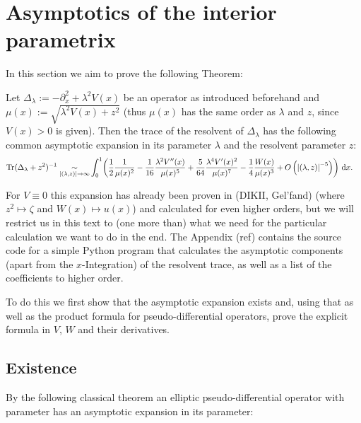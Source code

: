 \section{Asymptotics of the interior parametrix}
In this section we aim to prove the following Theorem:
\begin{MainTheorem}
  Let $\Delta_\lambda := -\partial_x^2 + \lambda^2V(x) $ be an operator as
  introduced beforehand and $\mu(x) := \sqrt{\lambda^2 V(x) + z^2}$ (thus
  $\mu(x)$ has the same order as $\lambda$ and $z$, since $V(x) > 0$ is given).
  Then the trace of the resolvent of $\Delta_\lambda$ has the following common
  asymptotic expansion in its parameter $\lambda$ and the resolvent parameter
  $z$:
  \begin{align*}
  \Tr(\Delta_\lambda + z^2)^{-1} \SimAs{\Abs{(\lambda, z)}\to\infty}&
   \Int{x}{\left(
      \frac12\frac1{\mu(x)^{2}}
     -\frac1{16}\frac{\lambda^2 V''(x)}{\mu(x)^5}
     +\frac{5}{64}\frac{\lambda^4V'(x)^2}{\mu(x)^7}
     -\frac14\frac{W(x)}{\mu(x)^3}
     +O\left(\Abs{(\lambda, z)}^{-5}\right)
   \right)}.
  \end{align*}
  \begin{Remark}
    For $V\equiv 0$ this expansion has already been proven in (DIKII, Gel'fand)
    (where $z^2 \mapsto \zeta$ and $W(x) \mapsto u(x)$) and calculated for even
    higher orders, but we will restrict us in this text to (one more than) what
    we need for the particular calculation we want to do in the end.  The
    Appendix (ref) contains the source code for a simple Python program that
    calculates the asymptotic components (apart from the $x$-Integration) of the
    resolvent trace, as well as a list of the coefficients to higher order.
  \end{Remark}
\end{MainTheorem}
To do this we first show that the asymptotic expansion exists and, using that as
well as the product formula for pseudo-differential operators, prove the
explicit formula in $V$, $W$ and their derivatives.
\subsection{Existence}
By the following classical theorem an elliptic pseudo-differential operator with
parameter has an asymptotic expansion in its parameter:

\begin{Proof}
\end{Proof}

